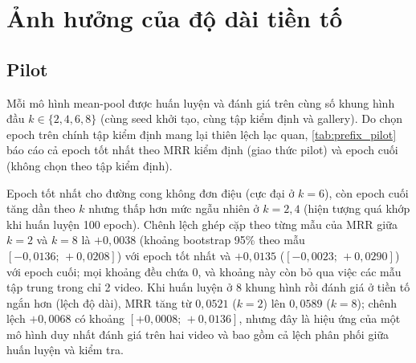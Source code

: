 \documentclass[12pt,a4paper]{report}
\begin{document}
\section{Ảnh hưởng của độ dài tiền tố}
\label{sec:prefix_results}

\subsection{Pilot}

Mỗi mô hình mean-pool được huấn luyện và đánh giá trên cùng số khung hình đầu $k\in\{2,4,6,8\}$ (cùng seed khởi tạo, cùng tập kiểm định và gallery). Do chọn epoch trên chính tập kiểm định mang lại thiên lệch lạc quan, \cref{tab:prefix_pilot} báo cáo cả epoch tốt nhất theo MRR kiểm định (giao thức pilot) và epoch cuối (không chọn theo tập kiểm định).

\begin{table}[ht]
    \centering
    \small
    \caption{Độ dài tiền tố, pilot (215 mẫu, 3 seed). Huấn luyện và đánh giá cùng $k$.}
    \label{tab:prefix_pilot}
\end{table}

Epoch tốt nhất cho đường cong không đơn điệu (cực đại ở $k=6$), còn epoch cuối tăng dần theo $k$ nhưng thấp hơn mức ngẫu nhiên ở $k=2,4$ (hiện tượng quá khớp khi huấn luyện 100 epoch). Chênh lệch ghép cặp theo từng mẫu của MRR giữa $k=2$ và $k=8$ là $+0{,}0038$ (khoảng bootstrap 95\% theo mẫu $[-0{,}0136;\,+0{,}0208]$) với epoch tốt nhất và $+0{,}0135$ ($[-0{,}0023;\,+0{,}0290]$) với epoch cuối; mọi khoảng đều chứa 0, và khoảng này còn bỏ qua việc các mẫu tập trung trong chỉ 2 video. Khi huấn luyện ở 8 khung hình rồi đánh giá ở tiền tố ngắn hơn (lệch độ dài), MRR tăng từ $0{,}0521$ ($k=2$) lên $0{,}0589$ ($k=8$); chênh lệch $+0{,}0068$ có khoảng $[+0{,}0008;\,+0{,}0136]$, nhưng đây là hiệu ứng của một mô hình duy nhất đánh giá trên hai video và bao gồm cả lệch phân phối giữa huấn luyện và kiểm tra.
\end{document}
